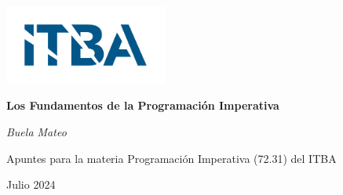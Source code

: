 
\pretitle{\begin{center}\Huge\bfseries}
\posttitle{\end{center}}
\preauthor{\begin{center}\Large}
\postauthor{\end{center}}
\predate{\begin{center}\large}
\postdate{\end{center}}

\titleformat{\section}[block]{\Large\bfseries\filcenter}{}{1em}{}

\begin{titlepage}
    \centering
    \vspace*{2cm}
    \includegraphics[width=0.4\textwidth]{Marca-ITBA-Color-ALTA.png}\par\vspace{1cm}
    {\Huge\bfseries Los Fundamentos de la Programación Imperativa\par}
    \vspace{1.5cm}
    {\Large\itshape Buela Mateo\par}
    \vfill
    Apuntes para la materia Programación Imperativa (72.31) del ITBA\par
    \vspace{0.8cm}
    {\Large Julio 2024\par}
    \vspace*{2cm}
\end{titlepage}

